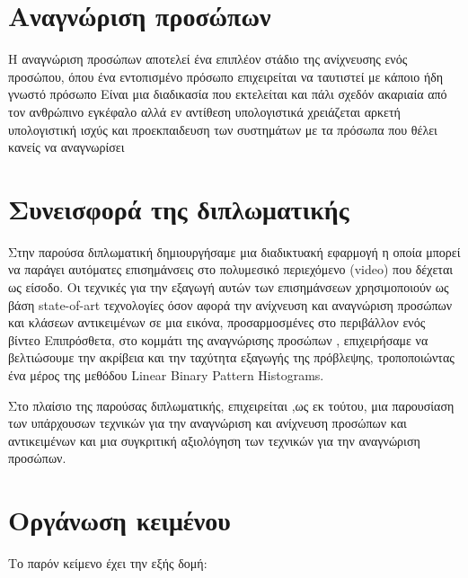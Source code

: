\section{Αναγνώριση προσώπων}
Η αναγνώριση προσώπων αποτελεί ένα επιπλέον στάδιο της ανίχνευσης ενός προσώπου,
όπου ένα εντοπισμένο πρόσωπο επιχειρείται να ταυτιστεί με κάποιο ήδη γνωστό πρόσωπο
Είναι μια διαδικασία που εκτελείται και πάλι σχεδόν ακαριαία από τον ανθρώπινο εγκέφαλο
αλλά εν αντίθεση υπολογιστικά χρειάζεται αρκετή υπολογιστική ισχύς και προεκπαιδευση
των συστημάτων με τα πρόσωπα που θέλει κανείς να αναγνωρίσει

\section{Συνεισφορά της διπλωματικής}

Στην παρούσα διπλωματική δημιουργήσαμε μια διαδικτυακή εφαρμογή η οποία μπορεί να παράγει
αυτόματες επισημάνσεις στο πολυμεσικό περιεχόμενο (video) που δέχεται ως
είσοδο. Οι τεχνικές για την εξαγωγή αυτών των επισημάνσεων χρησιμοποιούν
ως βάση state-of-art τεχνολογίες όσον αφορά την ανίχνευση και αναγνώριση προσώπων
και κλάσεων αντικειμένων σε μια εικόνα, προσαρμοσμένες στο περιβάλλον ενός βίντεο
Επιπρόσθετα, στο κομμάτι της αναγνώρισης προσώπων , επιχειρήσαμε να βελτιώσουμε την ακρίβεια
και την ταχύτητα εξαγωγής της πρόβλεψης, τροποποιώντας ένα μέρος της μεθόδου
Linear Binary Pattern Histograms.

Στο πλαίσιο της παρούσας διπλωματικής, επιχειρείται ,ως εκ τούτου, μια παρουσίαση
των υπάρχουσων τεχνικών για την αναγνώριση και ανίχνευση προσώπων και αντικειμένων
και μια συγκριτική αξιολόγηση των τεχνικών για την αναγνώριση προσώπων.

\section{Οργάνωση κειμένου}

Το παρόν κείμενο έχει την εξής δομή:

